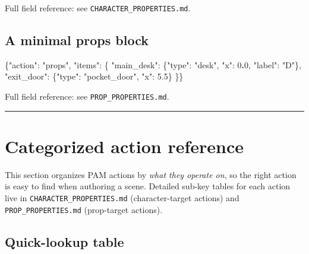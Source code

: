 \documentclass[
  11pt,
]{book}
\newenvironment{Shaded}{}{}
\newcommand{\DataTypeTok}[1]{\textcolor[rgb]{0.56,0.13,0.00}{#1}}
\newcommand{\DecValTok}[1]{\textcolor[rgb]{0.25,0.63,0.44}{#1}}
\newcommand{\ErrorTok}[1]{\textcolor[rgb]{1.00,0.00,0.00}{\textbf{#1}}}
\newcommand{\FloatTok}[1]{\textcolor[rgb]{0.25,0.63,0.44}{#1}}
\newcommand{\FunctionTok}[1]{\textcolor[rgb]{0.02,0.16,0.49}{#1}}
\newcommand{\StringTok}[1]{\textcolor[rgb]{0.25,0.44,0.63}{#1}}
\begin{document}
Full field reference: see \texttt{CHARACTER\_PROPERTIES.md}.

\subsection{A minimal props block}\label{a-minimal-props-block}

\begin{Shaded}
\begin{Highlighting}[]
\FunctionTok{\{}\DataTypeTok{"action"}\FunctionTok{:} \StringTok{"props"}\FunctionTok{,} \DataTypeTok{"items"}\FunctionTok{:} \FunctionTok{\{}
  \DataTypeTok{"main\_desk"}\FunctionTok{:} \FunctionTok{\{}\DataTypeTok{"type"}\FunctionTok{:} \StringTok{"desk"}\FunctionTok{,}     \DataTypeTok{"x"}\FunctionTok{:}  \DecValTok{0}\ErrorTok{.}\DecValTok{0}\FunctionTok{,} \DataTypeTok{"label"}\FunctionTok{:} \StringTok{"D"}\FunctionTok{\},}
  \DataTypeTok{"exit\_door"}\FunctionTok{:} \FunctionTok{\{}\DataTypeTok{"type"}\FunctionTok{:} \StringTok{"pocket\_door"}\FunctionTok{,} \DataTypeTok{"x"}\FunctionTok{:} \FloatTok{5.5}\FunctionTok{\}}
\FunctionTok{\}\}}
\end{Highlighting}
\end{Shaded}

Full field reference: see \texttt{PROP\_PROPERTIES.md}.

\begin{center}\rule{0.5\linewidth}{0.5pt}\end{center}

\section{Categorized action
reference}\label{categorized-action-reference}

This section organizes PAM actions by \emph{what they operate on}, so
the right action is easy to find when authoring a scene. Detailed
sub-key tables for each action live in \texttt{CHARACTER\_PROPERTIES.md}
(character-target actions) and \texttt{PROP\_PROPERTIES.md} (prop-target
actions).

\subsection{Quick-lookup table}\label{quick-lookup-table}
\end{document}
